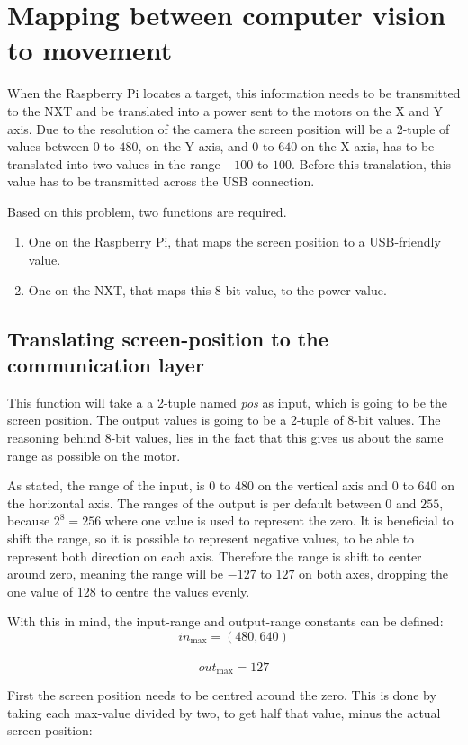 \section{Mapping between computer vision to movement}
When the Raspberry Pi locates a target, this information needs to be transmitted to the NXT and be translated into a power sent to the motors on the X and Y axis.
Due to the resolution of the camera the screen position will be a 2-tuple of values between $0$ to $480$, on the Y axis, and $0$ to $640$ on the X axis, has to be translated into two values in the range $-100$ to $100$.
Before this translation, this value has to be transmitted across the USB connection.

Based on this problem, two functions are required. 
\begin{enumerate}
	\item One on the Raspberry Pi, that maps the screen position to a USB-friendly value.
	\item One on the NXT, that maps this 8-bit value, to the power value.
\end{enumerate}


\subsection{Translating screen-position to the communication layer}
This function will take a a 2-tuple named \textit{pos} as input, which is going to be the screen position.
The output values is going to be a 2-tuple of 8-bit values.
The reasoning behind 8-bit values, lies in the fact that this gives us about the same range as possible on the motor.

As stated, the range of the input, is $0$ to $480$ on the vertical axis and $0$ to $640$ on the horizontal axis.
The ranges of the output is per default between $0$ and $255$, because $2^8 = 256 $ where one value is used to represent the zero.
It is beneficial to shift the range, so it is possible to represent negative values, to be able to represent both direction on each axis.
Therefore the range is shift to center around zero, meaning the range will be $-127$ to $127$ on both axes, dropping the one value of 128 to centre the values evenly.

With this in mind, the input-range and output-range constants can be defined:\\
$$in_\text{max} = (480,640)$$\\
$$out_\text{max} = 127$$

First the screen position needs to be centred around the zero. 
This is done by taking each max-value divided by two, to get half that value, minus the actual screen position:

